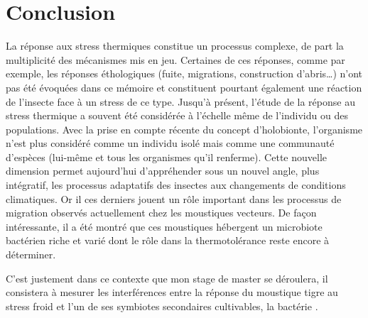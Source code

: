 
\section*{Conclusion}

La réponse aux stress thermiques constitue un processus complexe, de part la multiplicité des mécanismes mis en jeu. 
Certaines de ces réponses, comme par exemple, les réponses éthologiques (fuite, migrations, construction d'abris\ldots)  n'ont pas été évoquées dans ce mémoire et constituent pourtant également une réaction de l'insecte face à un stress de ce type.
Jusqu'à présent, l'étude de la réponse au stress thermique a souvent été considérée à l'échelle même de l'individu ou des populations.
Avec la prise en compte récente du concept d'holobionte, l'organisme n'est plus considéré comme un individu isolé mais comme une communauté d'espèces (lui-même et tous les organismes qu'il renferme).
Cette nouvelle dimension permet aujourd'hui d'appréhender sous un nouvel angle, plus intégratif, les processus adaptatifs des insectes aux changements de conditions climatiques.
Or il ces derniers jouent un rôle important dans les processus de migration observés actuellement chez les moustiques vecteurs.
De façon intéressante, il a été montré que ces moustiques hébergent un microbiote bactérien riche et varié dont le rôle dans la thermotolérance reste encore à déterminer. 

C'est justement dans ce contexte que mon stage de master se déroulera, il consistera à mesurer les interférences entre la réponse du moustique tigre  au stress froid et l'un de ses symbiotes secondaires cultivables, la bactérie .

